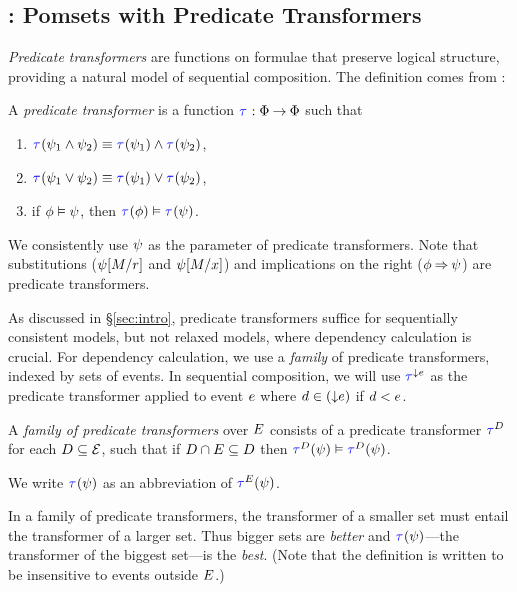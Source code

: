 \subsection{\PwTTITLE: Pomsets with Predicate Transformers}
\label{sec:pomsets}

\emph{Predicate transformers} are functions on formulae that preserve
logical structure, providing a natural model of sequential composition.
The definition comes from \citet{DBLP:journals/cacm/Dijkstra75}:

\begin{definition}
  \label{def:trans}
  A \emph{predicate transformer} is a %
  function
  $\aTr{}{}:\Formulae\fun\Formulae$ such that
  \begin{multicols}{2}
    \begin{enumerate}[,label=(\textsc{x}\arabic*),ref=\textsc{x}\arabic*]
    \item \label{tr-and}
      $\aTr{}{\bForm_1\land\bForm_2}\riff\aTr{}{\bForm_1}\land\aTr{}{\bForm_2}$,    
    \item \label{tr-or}
      $\aTr{}{\bForm_1\lor\bForm_2}\riff\aTr{}{\bForm_1}\lor\aTr{}{\bForm_2}$,
    \item \label{tr-implies}
      if $\phi \mathrel{\vDash} \psi$, then $\aTr{}{\aForm} \rimplies
      \aTr{}{\bForm}$.
    \end{enumerate}
  \end{multicols}
\end{definition}
\noindent
We consistently use $\psi$ as the parameter of predicate transformers.
Note that substitutions ($\psi[M/r]$ and $\psi[M/x]$) and
implications on the right ($\phi\mathbin{\Rightarrow}\psi$) are predicate
transformers.

As discussed in \S\ref{sec:intro}, predicate transformers suffice for
sequentially consistent models, but not relaxed models, where dependency
calculation is crucial.  For dependency calculation, we use a \emph{family}
of predicate transformers, indexed by sets of events. In sequential
composition, we will use $\aTr{\Cdown{\aEv}}{}$ as the predicate transformer
applied to event $e$ where $d\in(\smash{\downarrow}e)$ if $d<e$.  %

\begin{definition}
  \label{def:family}
  A \emph{family of predicate transformers} over $E$ consists of a
  predicate transformer $\aTr{\bEvs}{}$ for each $D\subseteq\mathcal{E}$,
  such that if $D \cap E \subseteq D$ then $\aTr{\cEvs}{\bForm}
  \rimplies \aTr{\bEvs}{\bForm}$.

  We write $\aTr{}{\bForm}$ as an abbreviation of $\aTr{\aEvs}{\bForm}$.
\end{definition}
In a family of predicate transformers, the transformer of a smaller set must
entail the transformer of a larger set.  Thus bigger sets are \emph{better}
and $\aTr{}{\bForm}$---the transformer of the biggest set---is the
\emph{best}.  (Note that the definition is written to be insensitive to
events outside $E$.)

